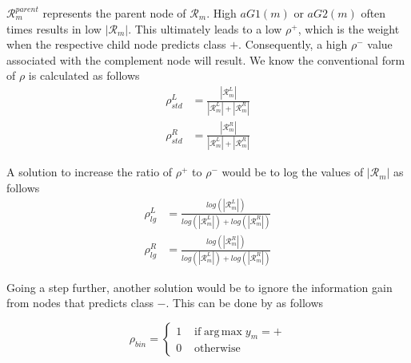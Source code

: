 \documentclass[twoside,11pt]{article}
\begin{document}
$\mathcal{R}_m^{parent}$ represents the parent node of $\mathcal{R}_m$. High $aG1(m)$ or $aG2(m)$ often times results in low $|\mathcal{R}_m|$. This ultimately leads to a low $\rho^{+}$, which is the weight when the respective child node predicts class $+$. Consequently, a high $\rho^{-}$ value associated with the complement node will result. We know the conventional form of $\rho$ is calculated as follows
\begin{equation}\label{eqn:rho_std}
\begin{aligned}
	\rho_{std}^L &= \frac{|\mathcal{R}_m^L|}{|\mathcal{R}_m^L|+|\mathcal{R}_m^R|} \\
	\rho_{std}^R &= \frac{|\mathcal{R}_m^R|}{|\mathcal{R}_m^L|+|\mathcal{R}_m^R|}
\end{aligned}
\end{equation}

A solution to increase the ratio of $\rho^{+}$ to $\rho^{-}$ would be to log the values of $|\mathcal{R}_m|$ as follows
\begin{equation}\label{eqn:rho_log}
\begin{aligned}
	\rho_{lg}^L &= \frac{log(|\mathcal{R}_m^L|)}{log(|\mathcal{R}_m^L|)+log(|\mathcal{R}_m^R|)}\\
	\rho_{lg}^R &= \frac{log(|\mathcal{R}_m^R|)}{log(|\mathcal{R}_m^L|)+log(|\mathcal{R}_m^R|)}
\end{aligned}
\end{equation}


Going a step further, another solution would be to ignore the information gain from nodes that predicts class $-$. This can be done by as follows

\begin{equation}
	\rho_{bin} = \begin{cases} 1 & \text{ if} \operatorname{arg\,max} y_m = + 
\\ 0&\text{ otherwise}
\end{cases}
\end{equation}
\end{document}
